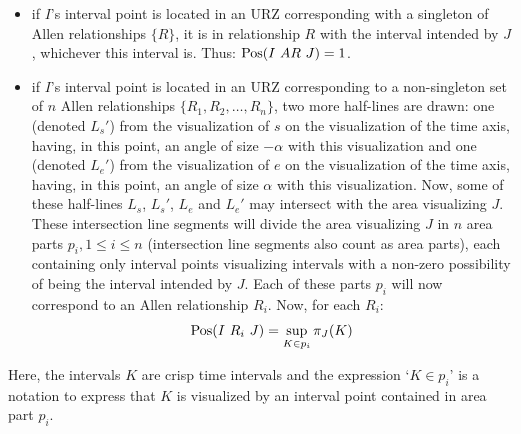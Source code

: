 \begin{itemize}
	\item if $I$'s interval point is located in an URZ corresponding with a singleton of Allen relationships $\{R\}$, it is in relationship $R$ with the interval intended by $J$, whichever this interval is. Thus: $\Pos(I\ AR\ J) = 1$.
	\item if $I$'s interval point is located in an URZ corresponding to a non-singleton set of $n$ Allen relationships $\{R_1, R_2, \ldots, R_n\}$, two more half-lines are drawn: one (denoted $L_s'$) from the visualization of $s$ on the visualization of the time axis, having, in this point, an angle of size $-\alpha$ with this visualization and one (denoted $L_e'$) from the visualization of $e$ on the visualization of the time axis, having, in this point, an angle of size $\alpha$ with this visualization. Now, some of these half-lines $L_s$, $L_s'$, $L_e$ and $L_e'$ may intersect with the area visualizing $J$. These intersection line segments will divide the area visualizing $J$ in $n$ area parts $p_i, 1 \leq i \leq n$ (intersection line segments also count as area parts), each containing only interval points visualizing intervals with a non-zero possibility of being the interval intended by $J$. Each of these parts $p_i$ will now correspond to an Allen relationship $R_i$. Now, for each $R_i$:
	\begin{equation}
		\operatorname{Pos}(I\ R_i\ J) = \sup_{K \in p_i} \pi_J(K)
	\end{equation}
\end{itemize}

Here, the intervals $K$ are crisp time intervals and the expression `$K \in p_i$' is a notation to express that $K$ is visualized by an interval point contained in area part $p_i$.



